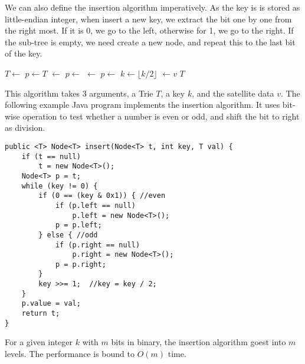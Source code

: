 \documentclass{article}
\begin{document}
We can also define the insertion algorithm imperatively.
As the key is is stored as little-endian integer, when insert a new key,
we extract the bit one by one from the right most.
If it is 0, we go to the left, otherwise for 1, we go to the right.
If the sub-tree is empty, we need create a new node, and repeat this to
the last bit of the key.

\begin{algorithmic}[1]
    \State $T \gets$ 
  \EndIf
  \State $p \gets T$
        \State {} $\gets$ 
      \EndIf
      \State $p \gets$ 
    \Else
        \State {} $\gets$ 
      \EndIf
      \State $p \gets$ 
    \EndIf
    \State $k \gets \lfloor k/2 \rfloor$
  \EndWhile
  \State {} $\gets v$
  \State \Return $T$
\EndFunction
\end{algorithmic}

This algorithm takes 3 arguments, a Trie $T$, a key $k$, and the satellite
data $v$. The following example Java program implements the insertion algorithm.
It uses bit-wise operation to test whether a number is even or odd, and shift
the bit to right as division.

\lstset{language=Java}
\begin{lstlisting}
public <T> Node<T> insert(Node<T> t, int key, T val) {
    if (t == null)
        t = new Node<T>();
    Node<T> p = t;
    while (key != 0) {
        if (0 == (key & 0x1)) { //even
            if (p.left == null)
                p.left = new Node<T>();
            p = p.left;
        } else { //odd
            if (p.right == null)
                p.right = new Node<T>();
            p = p.right;
        }
        key >>= 1;  //key = key / 2;
    }
    p.value = val;
    return t;
}
\end{lstlisting}

For a given integer $k$ with $m$ bits in binary, the insertion algorithm
goest into $m$ levels. The performance is bound to $O(m)$ time.

\end{document}

